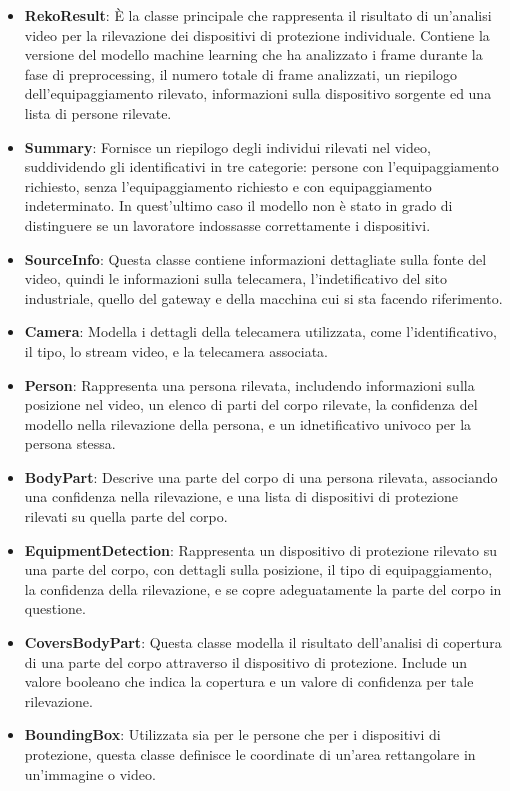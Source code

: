 \begin{itemize}
	\item \textbf{RekoResult}: È la classe principale che rappresenta il risultato di un'analisi video per la rilevazione dei dispositivi di protezione individuale. Contiene la versione del modello machine learning che ha analizzato i frame durante la fase di preprocessing, il numero totale di frame analizzati, un riepilogo dell'equipaggiamento rilevato, informazioni sulla dispositivo sorgente ed una lista di persone rilevate.
	\item \textbf{Summary}: Fornisce un riepilogo degli individui rilevati nel video, suddividendo gli identificativi in tre categorie: persone con l'equipaggiamento richiesto, senza l'equipaggiamento richiesto e con equipaggiamento indeterminato. In quest'ultimo caso il modello non è stato in grado di distinguere se un lavoratore indossasse correttamente i dispositivi.
	\item \textbf{SourceInfo}: Questa classe contiene informazioni dettagliate sulla fonte del video, quindi le informazioni sulla telecamera, l'indetificativo del sito industriale, quello del gateway e della macchina cui si sta facendo riferimento.
	\item \textbf{Camera}: Modella i dettagli della telecamera utilizzata, come l'identificativo, il tipo, lo stream video, e la telecamera associata.
	\item \textbf{Person}: Rappresenta una persona rilevata, includendo informazioni sulla posizione nel video, un elenco di parti del corpo rilevate, la confidenza del modello nella rilevazione della persona, e un idnetificativo univoco per la persona stessa.
	\item \textbf{BodyPart}: Descrive una parte del corpo di una persona rilevata, associando una confidenza nella rilevazione, e una lista di dispositivi di protezione rilevati su quella parte del corpo.
	\item \textbf{EquipmentDetection}: Rappresenta un dispositivo di protezione rilevato su una parte del corpo, con dettagli sulla posizione, il tipo di equipaggiamento, la confidenza della rilevazione, e se copre adeguatamente la parte del corpo in questione.
	\item \textbf{CoversBodyPart}: Questa classe modella il risultato dell'analisi di copertura di una parte del corpo attraverso il dispositivo di protezione. Include un valore booleano che indica la copertura e un valore di confidenza per tale rilevazione.
	\item \textbf{BoundingBox}: Utilizzata sia per le persone che per i dispositivi di protezione, questa classe definisce le coordinate di un'area rettangolare in un'immagine o video.
\end{itemize}

